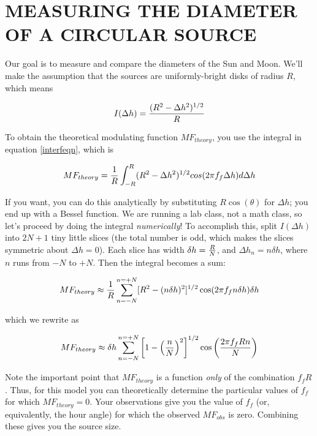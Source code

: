 \documentclass[11pt,preprint]{aastex}
\begin{document}
\section{MEASURING THE DIAMETER OF A CIRCULAR SOURCE}

Our goal is to measure and compare the diameters of the Sun and
Moon. We'll make the assumption that the sources are uniformly-bright
disks of radius $R$, which means

\begin{equation}
I(\Delta h) = { (R^2 - \Delta h^2)^{1/2} \over  R}
\end{equation}

\noindent To obtain the theoretical modulating function $MF_{theory}$, you use the integral in
equation \ref{interfeqn}, which is

\begin{equation}
MF_{theory} = {1 \over R} \int_{-R}^R (R^2 - \Delta h^2)^{1/2} 
	cos(2\pi f_f \Delta h) d \Delta h
\end{equation}

\noindent If you want, you can do this analytically by substituting $R
\cos (\theta)$ for $\Delta h$; you end up with a Bessel function. We are
running a lab class, not a math class, so let's proceed by doing the
integral {\it numerically}! To accomplish this, split $I(\Delta h)$ into
$2N + 1$ tiny little slices (the total number is odd, which makes the
slices symmetric about $\Delta h = 0$). Each slice has width $\delta h =
{R \over N}$, and $\Delta h_n = n \delta h$, where $n$ runs from $-N$ to
$+N$. Then the integral becomes a sum:

\begin{equation}
MF_{theory} \approx {1 \over R} \sum_{n=-N}^{n=+N}
[R^2 - (n \delta h)^2]^{1/2} \cos(2 \pi f_f n\delta h) \delta h
\end{equation}

\noindent which we rewrite as

\begin{equation}
MF_{theory} \approx  \delta h \sum_{n=-N}^{n=+N}
\left[ 1 - \left( n \over N\right)^2 \right]^{1/2} 
\cos \left( 2 \pi f_f R n \over N \right)
\end{equation}

\noindent Note the important point that $MF_{theory}$ is a function {\it only} of
the combination $f_f R$. Thus, for this model you can theoretically
determine the particular values of $f_f $ for which $MF_{theory} = 0$. Your
observations give you the value of $f_f$ (or, equivalently, the hour
angle) for which the observed $MF_{obs}$ is zero. Combining these gives
you the source size. 
\end{document}
